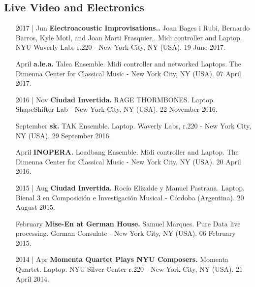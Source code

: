 \documentclass[12pt,overlapped]{res}%
\begin{document}
\begin{resume}
\subsection{Live Video and Electronics}%
\fullline%
\begin{itemize}[align=parleft,leftmargin=2.25cm,labelwidth=2cm]
\item[2017 | Jun]
\textbf{Electroacoustic Improvisations..}
Joan Bages i Rubi, Bernardo Barros, Kyle Motl, and Joan Marti Frasquier,. 
Midi controller and Laptop. 
NYU Waverly Labs r.220 {-} New York City, NY (USA). 
19 June 2017.
\end{itemize}%
\begin{itemize}[align=parleft,leftmargin=2.25cm,labelwidth=2cm]
\item[April]
\textbf{a.le.a.}
Talea Ensemble. 
Midi controller and networked Laptops. 
The Dimenna Center for Classical Music {-} New York City, NY (USA). 
07 April 2017.
\end{itemize}%
\begin{itemize}[align=parleft,leftmargin=2.25cm,labelwidth=2cm]
\item[2016 | Nov]
\textbf{Ciudad Invertida.}
RAGE THORMBONES. 
Laptop. 
ShapeShifter Lab {-} New York City, NY (USA). 
22 November 2016.
\end{itemize}%
\begin{itemize}[align=parleft,leftmargin=2.25cm,labelwidth=2cm]
\item[September]
\textbf{sk.}
TAK Ensemble. 
Laptop. 
Waverly Labs, r.220 {-} New York City, NY (USA). 
29 September 2016.
\end{itemize}%
\begin{itemize}[align=parleft,leftmargin=2.25cm,labelwidth=2cm]
\item[April]
\textbf{INOPERA.}
Loadbang Ensemble. 
Midi controller and Laptop. 
The Dimenna Center for Classical Music {-} New York City, NY (USA). 
20 April 2016.
\end{itemize}%
\begin{itemize}[align=parleft,leftmargin=2.25cm,labelwidth=2cm]
\item[2015 | Aug]
\textbf{Ciudad Invertida.}
Rocío Elizalde y Manuel Pastrana. 
Laptop. 
Bienal 3 en Composición e Investigación Musical {-} Córdoba (Argentina). 
20 August 2015.
\end{itemize}%
\begin{itemize}[align=parleft,leftmargin=2.25cm,labelwidth=2cm]
\item[February]
\textbf{Mise{-}En at German House.}
Samuel Marques. 
Pure Data live processing. 
German Consulate {-} New York City, NY (USA). 
06 February 2015.
\end{itemize}%
\begin{itemize}[align=parleft,leftmargin=2.25cm,labelwidth=2cm]
\item[2014 | Apr]
\textbf{Momenta Quartet Plays NYU Composers.}
Momenta Quartet. 
Laptop. 
NYU Silver Center r.220 {-} New York City, NY (USA). 
21 April 2014.
\end{itemize}%

\end{resume}
\end{document}
